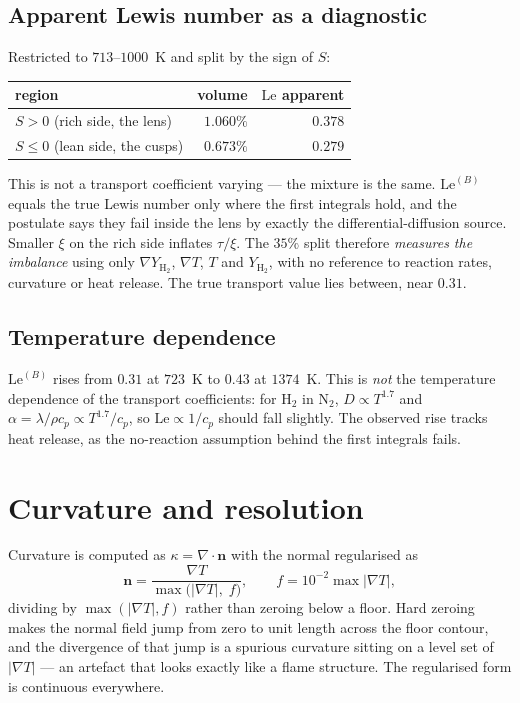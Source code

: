 \documentclass[11pt]{article}
\newcommand{\YH}{Y_{\mathrm{H_2}}}
\newcommand{\Le}{\mathrm{Le}}
\newcommand{\grad}{\nabla}
\begin{document}
\subsection{Apparent Lewis number as a diagnostic}

Restricted to $713$--$1000$~K and split by the sign of $S$:

\begin{center}
\begin{tabular}{lrr}
\toprule
region & volume & $\Le$ apparent \\
\midrule
$S > 0$ (rich side, the lens) & $1.060\%$ & $0.378$ \\
$S \le 0$ (lean side, the cusps) & $0.673\%$ & $0.279$ \\
\bottomrule
\end{tabular}
\end{center}

This is not a transport coefficient varying --- the mixture is the same.
$\Le^{(B)}$ equals the true Lewis number only where the first integrals hold,
and the postulate says they fail inside the lens by exactly the
differential-diffusion source. Smaller $\xi$ on the rich side inflates
$\tau/\xi$. The $35\%$ split therefore \emph{measures the imbalance} using
only $\grad \YH$, $\grad T$, $T$ and $\YH$, with no reference to reaction
rates, curvature or heat release. The true transport value lies between, near
$0.31$.

\subsection{Temperature dependence}

$\Le^{(B)}$ rises from $0.31$ at $723$~K to $0.43$ at $1374$~K. This is
\emph{not} the temperature dependence of the transport coefficients: for
H$_2$ in N$_2$, $D \propto T^{1.7}$ and $\alpha = \lambda/\rho c_p \propto
T^{1.7}/c_p$, so $\Le \propto 1/c_p$ should fall slightly. The observed rise
tracks heat release, as the no-reaction assumption behind the first integrals
fails.

\section{Curvature and resolution}
\label{sec:curvature-resolution}

Curvature is computed as $\kappa = \grad\!\cdot\mathbf{n}$ with the normal
regularised as
\begin{equation}
  \mathbf{n} = \frac{\grad T}{\max\!\big(|\grad T|,\; f\big)},
  \qquad f = 10^{-2}\max|\grad T|,
\end{equation}
dividing by $\max(|\grad T|, f)$ rather than zeroing below a floor. Hard
zeroing makes the normal field jump from zero to unit length across the floor
contour, and the divergence of that jump is a spurious curvature sitting on a
level set of $|\grad T|$ --- an artefact that looks exactly like a flame
structure. The regularised form is continuous everywhere.
\end{document}
